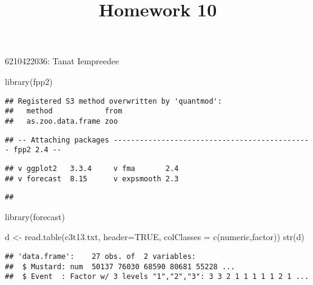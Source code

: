 \documentclass[
]{article}
\title{Homework 10}
\author{}
\date{\vspace{-2.5em}}
\newenvironment{Shaded}{\begin{snugshade}}{\end{snugshade}}
\newcommand{\AttributeTok}[1]{\textcolor[rgb]{0.77,0.63,0.00}{#1}}
\newcommand{\ConstantTok}[1]{\textcolor[rgb]{0.00,0.00,0.00}{#1}}
\newcommand{\FunctionTok}[1]{\textcolor[rgb]{0.00,0.00,0.00}{#1}}
\newcommand{\NormalTok}[1]{#1}
\newcommand{\OtherTok}[1]{\textcolor[rgb]{0.56,0.35,0.01}{#1}}
\newcommand{\StringTok}[1]{\textcolor[rgb]{0.31,0.60,0.02}{#1}}
\begin{document}
\maketitle

6210422036: Tanat Iempreedee

\begin{Shaded}
\begin{Highlighting}[]
\FunctionTok{library}\NormalTok{(fpp2)}
\end{Highlighting}
\end{Shaded}

\begin{verbatim}
## Registered S3 method overwritten by 'quantmod':
##   method            from
##   as.zoo.data.frame zoo
\end{verbatim}

\begin{verbatim}
## -- Attaching packages ---------------------------------------------- fpp2 2.4 --
\end{verbatim}

\begin{verbatim}
## v ggplot2   3.3.4     v fma       2.4  
## v forecast  8.15      v expsmooth 2.3
\end{verbatim}

\begin{verbatim}
## 
\end{verbatim}

\begin{Shaded}
\begin{Highlighting}[]
\FunctionTok{library}\NormalTok{(forecast)}

\NormalTok{d }\OtherTok{\textless{}{-}} \FunctionTok{read.table}\NormalTok{(}\StringTok{\textquotesingle{}c3t13.txt\textquotesingle{}}\NormalTok{, }\AttributeTok{header=}\ConstantTok{TRUE}\NormalTok{,}
                \AttributeTok{colClasses =} \FunctionTok{c}\NormalTok{(}\StringTok{\textquotesingle{}numeric\textquotesingle{}}\NormalTok{,}\StringTok{\textquotesingle{}factor\textquotesingle{}}\NormalTok{))}
\FunctionTok{str}\NormalTok{(d)}
\end{Highlighting}
\end{Shaded}

\begin{verbatim}
## 'data.frame':    27 obs. of  2 variables:
##  $ Mustard: num  50137 76030 68590 80681 55228 ...
##  $ Event  : Factor w/ 3 levels "1","2","3": 3 3 2 1 1 1 1 1 2 1 ...
\end{verbatim}
\end{document}
